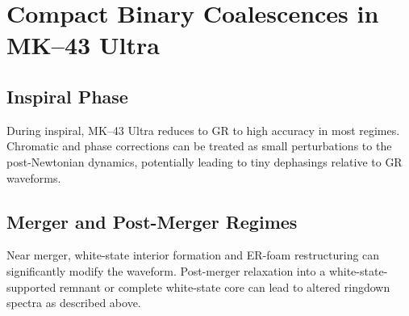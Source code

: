 \chapter{Compact Binary Coalescences in MK--43 Ultra}

\section{Inspiral Phase}

During inspiral, MK--43 Ultra reduces to GR to high accuracy in most regimes.
Chromatic and phase corrections can be treated as small perturbations to the post-Newtonian dynamics, potentially leading to tiny dephasings relative to GR waveforms.

\section{Merger and Post-Merger Regimes}

Near merger, white-state interior formation and ER-foam restructuring can significantly modify the waveform.
Post-merger relaxation into a white-state-supported remnant or complete white-state core can lead to altered ringdown spectra as described above.

